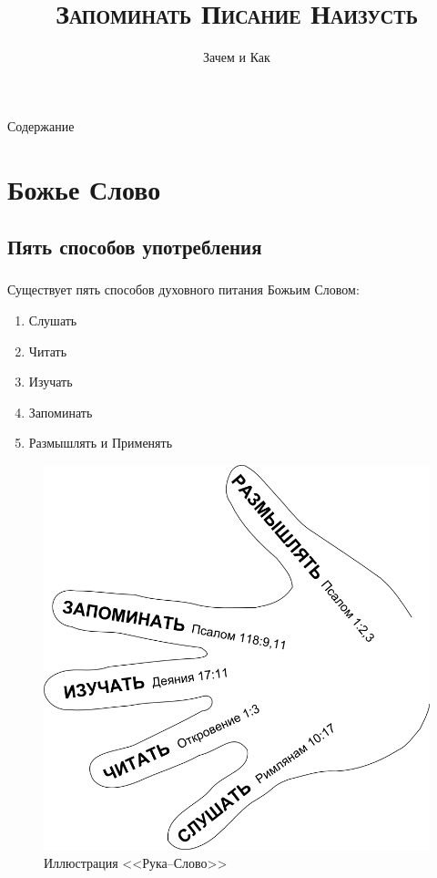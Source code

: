 \documentclass[t,aspectratio=169]{beamer}  %
\title{\textsc{\textbf{Запоминать Писание Наизусть}}}
\subtitle{Зачем и Как}
\author[Библейская Церковь СПб]{}
\date{}
\begin{document}
\frame[plain]{\titlepage}	%
\begin{frame}{Содержание}
	\begin{multicols}{2}
    \tableofcontents
	\end{multicols}
\end{frame}
\section{Божье Слово}
\subsection{Пять способов употребления}
\begin{frame}
	\frametitle{\insertsection} 
	\framesubtitle{\insertsubsection}
	Существует пять способов духовного питания Божьим Словом:
	\begin{multicols}{2}
	\begin{enumerate}
		\item Слушать \pause
		\item Читать \pause
		\item Изучать \pause
		\item Запоминать \pause
		\item Размышлять и Применять
	\end{enumerate}
	\begin{figure}
		\includegraphics[height=0.6\textheight]{hand-word-ru-800}
		\caption{Иллюстрация <<Рука--Слово>>}
	\end{figure}	
	\end{multicols}
\end{frame}
\end{document}
